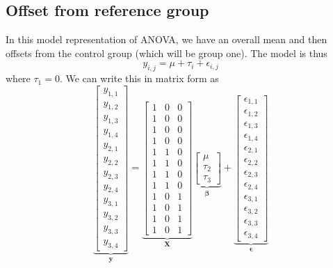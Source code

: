 \documentclass[]{book}
\theoremstyle{definition}
\theoremstyle{definition}
\theoremstyle{remark}
\begin{document}
\subsection{Offset from reference
group}\label{offset-from-reference-group}

In this model representation of ANOVA, we have an overall mean and then
offsets from the control group (which will be group one). The model is
thus \[
y_{i,j}=\mu+\tau_{i}+\epsilon_{i,j}
\] where \(\tau_{1}=0\). We can write this in matrix form as \[
\underset{\boldsymbol{y}}{\underbrace{\left[\begin{array}{c}
y_{1,1}\\
y_{1,2}\\
y_{1,3}\\
y_{1,4}\\
y_{2,1}\\
y_{2,2}\\
y_{2,3}\\
y_{2,4}\\
y_{3,1}\\
y_{3,2}\\
y_{3,3}\\
y_{3,4}
\end{array}\right]}}=\underset{\mathbf{X}}{\underbrace{\left[\begin{array}{ccc}
1 & 0 & 0\\
1 & 0 & 0\\
1 & 0 & 0\\
1 & 0 & 0\\
1 & 1 & 0\\
1 & 1 & 0\\
1 & 1 & 0\\
1 & 1 & 0\\
1 & 0 & 1\\
1 & 0 & 1\\
1 & 0 & 1\\
1 & 0 & 1
\end{array}\right]}}\underset{\boldsymbol{\beta}}{\underbrace{\left[\begin{array}{c}
\mu\\
\tau_{2}\\
\tau_{3}
\end{array}\right]}}+\underset{\boldsymbol{\epsilon}}{\underbrace{\left[\begin{array}{c}
\epsilon_{1,1}\\
\epsilon_{1,2}\\
\epsilon_{1,3}\\
\epsilon_{1,4}\\
\epsilon_{2,1}\\
\epsilon_{2,2}\\
\epsilon_{2,3}\\
\epsilon_{2,4}\\
\epsilon_{3,1}\\
\epsilon_{3,2}\\
\epsilon_{3,3}\\
\epsilon_{3,4}
\end{array}\right]}}
\]
\end{document}
